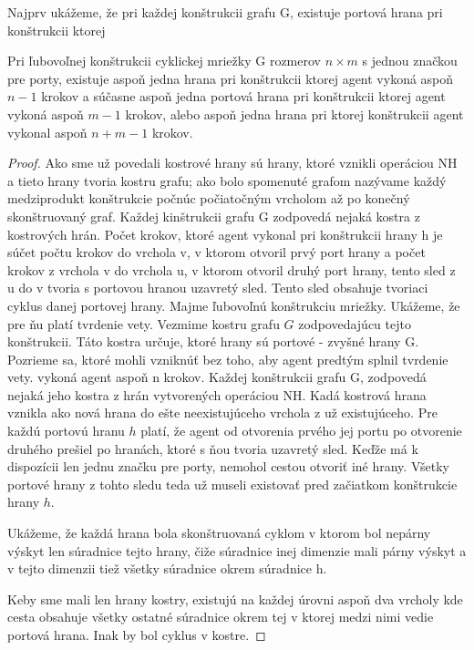 Najprv ukážeme, že pri každej konštrukcii grafu G, existuje portová hrana
pri konštrukcii ktorej


\begin{lem}
Pri ľubovoľnej konštrukcii cyklickej mriežky G rozmerov $n \times m$ s jednou značkou
pre porty, existuje aspoň jedna hrana pri konštrukcii ktorej agent vykoná 
aspoň $n - 1$ krokov
a súčasne aspoň jedna portová hrana pri konštrukcii ktorej agent vykoná aspoň $m - 1$
krokov, alebo aspoň jedna hrana pri ktorej konštrukcii agent vykonal aspoň
$n+m - 1$ krokov.
\end{lem}
\begin{proof}
Ako sme už povedali kostrové hrany sú hrany, ktoré vznikli operáciou NH a
tieto hrany tvoria kostru grafu; ako bolo spomenuté grafom nazývame každý
medziprodukt konštrukcie počnúc počiatočným vrcholom až po konečný
skonštruovaný graf.
Každej kinštrukcii grafu G zodpovedá nejaká kostra z kostrových hrán. Počet
krokov, ktoré agent vykonal pri konštrukcii hrany h je súčet počtu krokov do
vrchola v, v ktorom otvoril prvý port hrany a počet krokov z vrchola v do
vrchola u, v ktorom otvoril druhý port hrany, 
tento sled z u do v tvoria s portovou
hranou uzavretý sled. Tento sled obsahuje tvoriaci cyklus danej portovej
hrany.
Majme ľubovoľnú konštrukciu mriežky. Ukážeme, že pre ňu platí tvrdenie vety.
Vezmime kostru grafu $G$ zodpovedajúcu tejto konštrukcii. Táto kostra
určuje, ktoré hrany sú portové - zvyšné hrany G. Pozrieme sa, ktoré mohli
vzniknúť bez toho, aby agent predtým splnil tvrdenie vety.
 vykoná agent aspoň n krokov.
Každej konštrukcii grafu G, zodpovedá nejaká jeho kostra z hrán vytvorených
operáciou NH. Kadá kostrová hrana vznikla ako nová hrana do ešte
neexistujúceho vrchola z už existujúceho. Pre každú portovú hranu $h$ platí, že
agent od otvorenia prvého jej portu po otvorenie druhého prešiel po hranách,
ktoré s ňou tvoria uzavretý sled. Keďže má k dispozícii len jednu značku pre
porty, nemohol cestou otvoriť iné hrany. Všetky portové hrany z tohto sledu
teda už museli existovať pred začiatkom konštrukcie hrany $h$.

Ukážeme, že každá hrana bola skonštruovaná cyklom v ktorom bol nepárny
výskyt len súradnice tejto hrany, čiže súradnice inej dimenzie mali párny
výskyt a v tejto dimenzii tiež všetky súradnice okrem súradnice h.

Keby sme mali len hrany kostry, existujú na každej úrovni aspoň dva vrcholy
kde cesta obsahuje všetky ostatné súradnice okrem tej v ktorej medzi nimi
vedie portová hrana. Inak by bol cyklus v kostre.


\end{proof}
